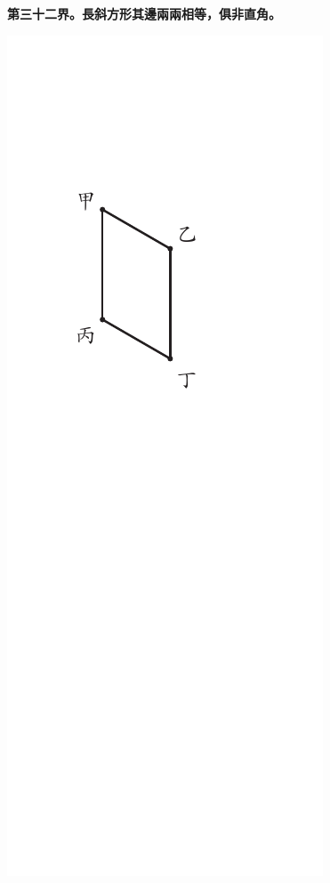 \documentclass[12pt,b5paper,landscape]{article}
\newcommand{\cthm}[1]{{
\vspace{8pt}

\bfseries #1}}
\begin{document}
\begin{multicols}{2}
\cthm{第三十二界。長斜方形其邊兩兩相等，俱非直角。}
\begin{center}
\includegraphics[angle=90]{eu22}
\end{center}


\end{multicols}
\end{document}
